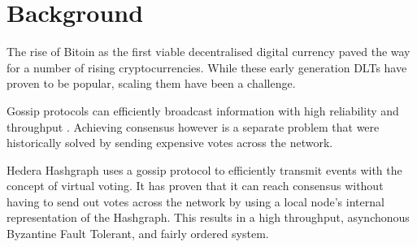 \section{Background}

The rise of Bitoin as the first viable decentralised digital currency paved the way for a number of rising cryptocurrencies. While these early generation DLTs have proven to be popular, scaling them have been a challenge. 


Gossip protocols can efficiently broadcast information with high reliability and throughput \cite{birman}. Achieving consensus however is a separate problem that were historically solved by sending expensive votes across the network.

Hedera Hashgraph uses a gossip protocol to efficiently transmit events with the concept of virtual voting. It has proven that it can reach consensus without having to send out votes across the network by using a local node's internal representation of the Hashgraph. This results in a high throughput, asynchonous Byzantine Fault Tolerant, and fairly ordered system.

